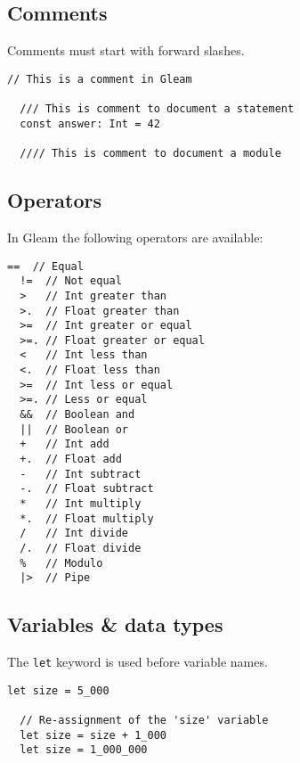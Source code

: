 \subsection*{\rmfamily Comments}

Comments must start with forward slashes.

\begin{lstlisting}[belowskip=-\baselineskip]
  // This is a comment in Gleam

  /// This is comment to document a statement
  const answer: Int = 42

  //// This is comment to document a module
\end{lstlisting}

\vs
\subsection*{\rmfamily Operators}

In Gleam the following operators are available:

\begin{lstlisting}[belowskip=-\baselineskip]
  ==  // Equal
  !=  // Not equal
  >   // Int greater than
  >.  // Float greater than
  >=  // Int greater or equal
  >=. // Float greater or equal
  <   // Int less than
  <.  // Float less than
  >=  // Int less or equal
  >=. // Less or equal
  &&  // Boolean and
  ||  // Boolean or	
  +   // Int add
  +.  // Float add
  -   // Int subtract
  -.  // Float subtract
  *   // Int multiply
  *.  // Float multiply
  /   // Int divide
  /.  // Float divide
  %   // Modulo	
  |>  // Pipe
\end{lstlisting}


\vs
\subsection*{\rmfamily Variables \& data types}

The \lstinline[language=Gleam, basicstyle=\small]!let! keyword is used 
before variable names.

\begin{lstlisting}[belowskip=-\baselineskip]
  let size = 5_000

  // Re-assignment of the 'size' variable
  let size = size + 1_000
  let size = 1_000_000
\end{lstlisting}

